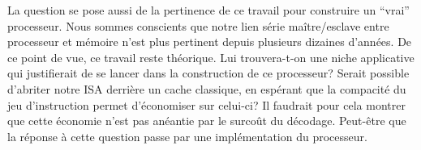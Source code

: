 \documentclass[architecture]{compas2018}
\begin{document}
La question se pose aussi de la pertinence de ce travail pour construire un ``vrai'' processeur.
Nous sommes conscients que notre  lien série maître/esclave entre processeur et mémoire n'est plus pertinent depuis plusieurs dizaines d'années.
De ce point de vue, ce travail reste théorique.
Lui trouvera-t-on une niche applicative qui justifierait de se lancer dans la construction de ce processeur?  
Serait possible d'abriter notre ISA derrière un cache classique, en espérant que la compacité du jeu d'instruction permet d'économiser sur celui-ci?
Il faudrait pour cela montrer que cette économie n'est pas anéantie par le surcoût du décodage.
Peut-être que la réponse à cette question passe par une implémentation du processeur.




  \iffalse
\end{document}
